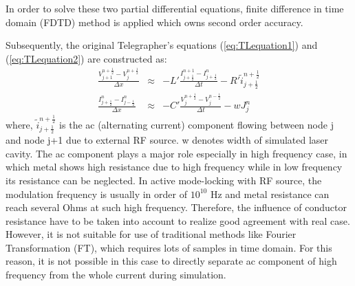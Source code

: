 \documentclass[11pt,final]{scrbook}
\begin{document}
In order to solve these two partial differential equations, finite difference in time domain (FDTD) method is applied which owns second order accuracy.


Subsequently, the original Telegrapher's equations (\ref{eq:TLequation1}) and (\ref{eq:TLequation2}) are constructed as:
\begin{eqnarray}
\frac { { V }_{ j+1 }^{ n+\frac{1}{2} }-{ V }_{ j }^{ n+\frac{1}{2} } }{ \Delta x } & \approx & -L'\frac { { I }_{ j+\frac{1}{2} }^{ n+1 }-{ I }_{ j+\frac{1}{2} }^{ n } }{ \Delta t } -R' \widetilde{ i } _{ j+\frac{1}{2} }^{ n+\frac{1}{2} } \label{eq:TLequation3}\\
\frac{{ I }_{ j+\frac{1}{2} }^{ n } - { I }_{ j-\frac{1}{2} }^{ n }}{\Delta x} & \approx & -C'\frac {{ V }_{ j }^{ n+\frac{1}{2} }-{ V }_{ j }^{ n-\frac{1}{2} }}{ \Delta t }-w{J}_{j}^{n} \label{eq:TLequation4}
\end{eqnarray}
where, $ \widetilde{ i } _{ j+\frac{1}{2} }^{ n+\frac{1}{2} }$ is the ac (alternating current) component flowing between node j and node j+1 due to external RF source. w denotes width of simulated laser cavity. The ac component plays a major role especially in high frequency case, in which metal shows high resistance due to high frequency while in low frequency its resistance can be neglected. In active mode-locking with RF source, the modulation frequency is usually in order of $10^{10}$ Hz and metal resistance can reach several Ohms at such high frequency. Therefore, the influence of conductor resistance have to be taken into account to realize good agreement with real case. However, it is not suitable for use of traditional methods like Fourier Transformation (FT), which requires lots of samples in time domain. For this reason, it is not possible in this case to directly separate ac component of high frequency from the whole current during simulation.
\end{document}
